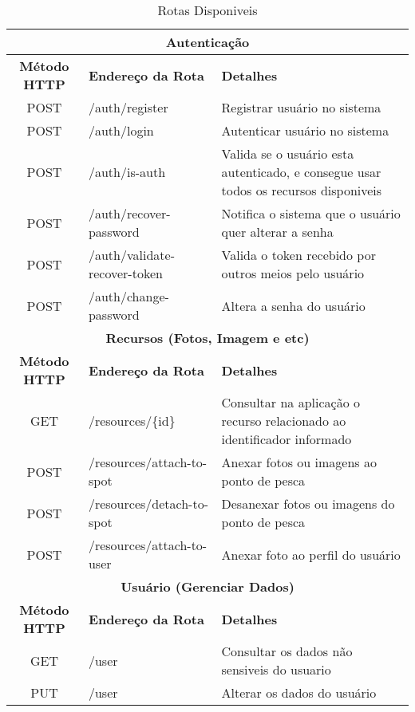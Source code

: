 \begin{table}[h!]
    \centering
    \caption[Rotas Disponiveis]{Rotas Disponiveis
    \label{tab:tb-api-fishspot}}
    \setlength{\extrarowheight}{4pt}
    \begin{tabular}{|c|l|p{}|} 
        \hline
        \multicolumn{3}{|c|}{\textbf{Autenticação}} \\
        \hline
        \textbf{Método HTTP} & \textbf{Endereço da Rota} & \textbf{Detalhes} \\
        \hline
        POST & /auth/register & Registrar usuário no sistema \\
        \hline
        POST & /auth/login & Autenticar usuário no sistema \\
        \hline
        POST & /auth/is-auth & Valida se o usuário esta autenticado, e consegue usar todos os recursos disponiveis \\
        \hline
        POST & /auth/recover-password & Notifica o sistema que o usuário quer alterar a senha \\
        \hline
        POST & /auth/validate-recover-token & Valida o token recebido por outros meios pelo usuário \\
        \hline
        POST & /auth/change-password & Altera a senha do usuário \\
        \hline


        \multicolumn{3}{|c|}{\textbf{Recursos (Fotos, Imagem e etc)}} \\
        \hline
        \textbf{Método HTTP} & \textbf{Endereço da Rota} & \textbf{Detalhes} \\
        \hline
        GET & /resources/\{id\} & Consultar na aplicação o recurso relacionado ao identificador informado \\
        \hline
        POST & /resources/attach-to-spot & Anexar fotos ou imagens ao ponto de pesca \\
        \hline
        POST & /resources/detach-to-spot & Desanexar fotos ou imagens do ponto de pesca \\
        \hline
        POST & /resources/attach-to-user & Anexar foto ao perfil do usuário \\
        \hline


        \multicolumn{3}{|c|}{\textbf{Usuário (Gerenciar Dados)}} \\
        \hline
        \textbf{Método HTTP} & \textbf{Endereço da Rota} & \textbf{Detalhes} \\
        \hline
        GET & /user & Consultar os dados não sensiveis do usuario \\
        \hline
        PUT & /user & Alterar os dados do usuário \\
        \hline

    \end{tabular}
\end{table}

